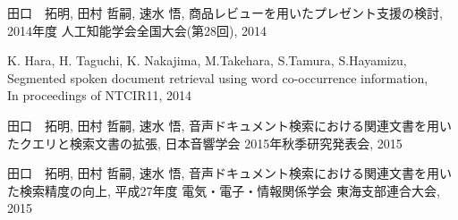 %
\renewcommand{\bibname}{発表文献}
\begin{thebibliography}{99} %



田口　拓明, 田村 哲嗣,	 速水 悟, 商品レビューを用いたプレゼント支援の検討, 2014年度 人工知能学会全国大会(第28回), 2014

K. Hara, H. Taguchi, K. Nakajima, M.Takehara, S.Tamura, S.Hayamizu, \\
Segmented spoken document retrieval using word co-occurrence information, \\
In proceedings of NTCIR11, 2014

田口　拓明, 田村 哲嗣,	 速水 悟, 音声ドキュメント検索における関連文書を用いたクエリと検索文書の拡張, 日本音響学会 2015年秋季研究発表会, 2015

田口　拓明, 田村 哲嗣,	 速水 悟, 音声ドキュメント検索における関連文書を用いた検索精度の向上, 平成27年度 電気・電子・情報関係学会 東海支部連合大会, 2015
   
\end{thebibliography}
